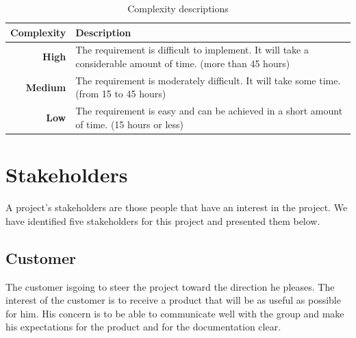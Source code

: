 \begin{table}[h]
\begin{center}
\begin{tabular}{ | r | p{11.5cm} | }
  \hline
  \textbf{Complexity} & \textbf{Description} \\
  \hline\noalign{\smallskip}\noalign{\smallskip}\hline
  \textbf{High} & The requirement is difficult to implement.\newline
  It will take a considerable amount of time. (more than 45 hours) \\
  \textbf{Medium} & The requirement is moderately difficult.\newline
  It will take some time. (from 15 to 45 hours) \\
  \textbf{Low} & The requirement is easy and can be achieved\newline
  in a short amount of time. (15 hours or less) \\
  \hline
\end{tabular}
\end{center}
\caption{Complexity descriptions}
\label{table:complexity}
\end{table}



\section{Stakeholders}
\label{section:stakeholders}
A project's stakeholders are those people that have an interest in the project.
We have identified five stakeholders for this project and presented them below.

\subsection{Customer}
The customer isgoing to steer the project toward the direction he pleases.
The interest of the customer is to receive a product that will be as useful as possible for him.
His concern is to be able to communicate well with the group and make his expectations for the product
and for the documentation clear.

